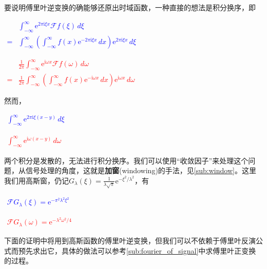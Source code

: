 \documentclass{ctexbook}
\newcommand{\lr}[2]{%
    \begin{center}
    \begin{minipage}[t]{0.45\textwidth}
        \centering
        \allowdisplaybreaks
        \textcolor{blue}{%
            \begin{varwidth}{\linewidth}
            $\begin{aligned}
            #1
            \end{aligned}$
            \end{varwidth}
        }
    \end{minipage}
    \hfill
    \begin{minipage}[t]{0.45\textwidth}
        \centering
        \allowdisplaybreaks
        \textcolor{red}{%
            \begin{varwidth}{\linewidth}
            $\begin{aligned}
            #2
            \end{aligned}$
            \end{varwidth}
        }
    \end{minipage}
\end{center}
}
\begin{document}
要说明傅里叶逆变换的确能够还原出时域函数，一种直接的想法是积分换序，即\lr{
    &\int_{-\infty}^{\infty}\mathrm{e}^{2\pi \mathrm{i}\xi x}\mathcal{F} f(\xi)\,d\xi\\
    =&\int_{-\infty}^{\infty}\left(\int_{-\infty}^{\infty}f(x)\mathrm{e}^{-2\pi \mathrm{i}\xi x}\,dx\right)\mathrm{e}^{2\pi \mathrm{i}\xi x}\,d\xi
}{
    &\frac{1}{2\pi}\int_{-\infty}^{\infty}\mathrm{e}^{\mathrm{i}\omega x}\mathcal{F} f(\omega)\,d\omega\\
    =&\frac{1}{2\pi}\int_{-\infty}^{\infty}\left(\int_{-\infty}^{\infty}f(x)\mathrm{e}^{-\mathrm{i}\omega x}\,dx\right)\mathrm{e}^{\mathrm{i}\omega x}\,d\omega
}
然而，\lr{
    \int_{-\infty}^{\infty}\mathrm{e}^{2\pi \mathrm{i}\xi (x-y)}\,d\xi
}{
    \int_{-\infty}^{\infty}\mathrm{e}^{\mathrm{i}\omega (x-y)}\,d\omega
}
两个积分是发散的，无法进行积分换序。我们可以使用“收敛因子”来处理这个问题，从信号处理的角度，这就是\textbf{加窗}(windowing)的手法，见\ref{sub:window}。这里我们用高斯窗，仍记$G_\lambda(\xi)=\frac{1}{\lambda\sqrt{\pi}}\mathrm{e}^{-\xi^2/\lambda^2}$，有\lr{
    \mathcal{F} G_\lambda(\xi)=\mathrm{e}^{-\pi^2 \lambda^2 \xi^2}
}{
    \mathcal{F} G_\lambda(\omega)=\mathrm{e}^{-\lambda^2 \omega^2/4}
}
下面的证明中将用到高斯函数的傅里叶逆变换，但我们可以不依赖于傅里叶反演公式而预先求出它，具体的做法可以参考\ref{sub:fourier_of_signal}中求傅里叶正变换的过程。
\end{document}
